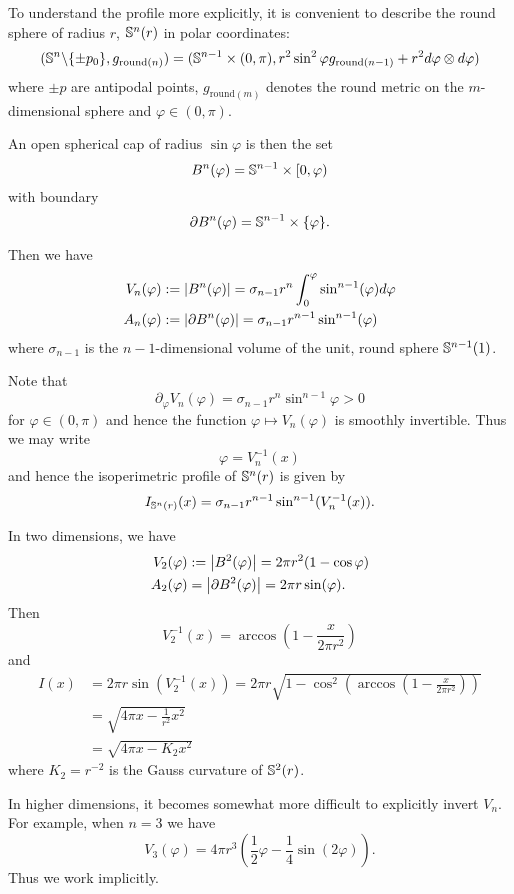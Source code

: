 \documentclass{amsart}
\begin{document}
To understand the profile more explicitly, it is convenient to describe the round sphere of radius \(r\), \(\S^n(r)\) in polar coordinates:
\[
(\S^n\backslash \{\pm p_0\}, g_{\text{round}(n)}) = (\S^{n-1} \times (0, \pi), r^2 \sin^2 \varphi g_{\text{round}(n-1)} + r^2 d\varphi \otimes d\varphi)
\]
where \(\pm p\) are antipodal points, \(g_{\text{round}(m)}\) denotes the round metric on the \(m\)-dimensional sphere and \(\varphi \in (0, \pi)\).

An open spherical cap of radius \(\sin \varphi\) is then the set
\[
B^n(\varphi) = \S^{n-1} \times [0, \varphi)
\]
with boundary
\[
\bdry{B^n(\varphi)} = \S^{n-1} \times \{\varphi\}.
\]

Then we have
\begin{align*}
V_n(\varphi) &:= \abs{B^n(\varphi)} = \sigma_{n-1} r^n \int_0^{\varphi} \sin^{n-1} (\varphi) d\varphi \\
A_n(\varphi) &:= \abs{\bdry{B^n(\varphi)}} = \sigma_{n-1} r^{n-1} \sin^{n-1} (\varphi)
\end{align*}
where \(\sigma_{n-1}\) is the \(n-1\)-dimensional volume of the unit, round sphere \(\S^{n-1}(1)\).

Note that
\[
\partial_{\varphi} V_n(\varphi) = \sigma_{n-1} r^n \sin^{n-1} \varphi > 0
\]
for \(\varphi \in (0, \pi)\) and hence the function \(\varphi \mapsto V_n(\varphi)\) is smoothly invertible. Thus we may write
\[
\varphi = V_n^{-1}(x)
\]
and hence the isoperimetric profile of \(\S^n(r)\) is given by
\[
I_{\S^n(r)} (x) = \sigma_{n-1} r^{n-1} \sin^{n-1} (V_n^{-1}(x)).
\]

In two dimensions, we have
\begin{align*}
V_2(\varphi) &:= \abs{B^2(\varphi)} = 2\pi r^2(1-\cos\varphi) \\
A_2(\varphi) &= \abs{\bdry{B^2(\varphi)}} = 2\pi r \sin (\varphi).
\end{align*}
Then
\[
V_2^{-1}(x) = \arccos\left(1 - \frac{x}{2\pi r^2} \right)
\]
and
\[
\begin{split}
I(x) &= 2\pi r \sin(V_2^{-1}(x)) = 2\pi r \sqrt{1 - \cos^2\left(\arccos\left(1 - \frac{x}{2\pi r^2} \right)\right)} \\
&= \sqrt{4\pi x - \frac{1}{r^2} x^2} \\
&= \sqrt{4\pi x - K_2 x^2}
\end{split}
\]
where \(K_2 = r^{-2}\) is the Gauss curvature of \(\S^2(r)\).

In higher dimensions, it becomes somewhat more difficult to explicitly invert \(V_n\). For example, when \(n = 3\) we have
\[
V_3(\varphi) = 4\pi r^3\left(\frac{1}{2} \varphi - \frac{1}{4}\sin(2 \varphi)\right).
\]
Thus we work implicitly.
\end{document}
